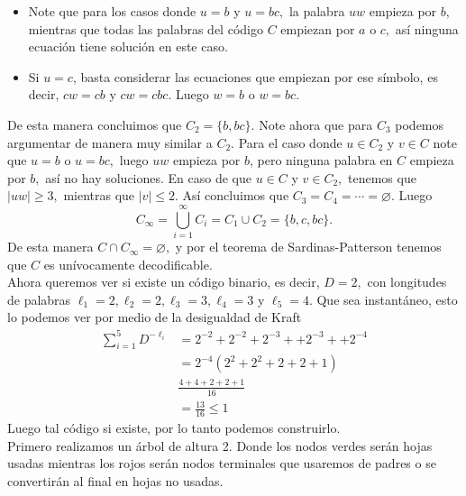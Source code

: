 \begin{sols}
    \begin{itemize}
        \item Note que para los casos donde $u=b$ y $u=bc,$ la palabra $uw$ empieza por $b,$ mientras que todas las palabras del código $C$ empiezan por $a$ o $c,$ así ninguna ecuación tiene solución en este caso.
        \item Si $u=c$, basta considerar las ecuaciones que empiezan por ese símbolo, es decir, $cw=cb$ y $cw=cbc.$ Luego $w=b$ o $w=bc.$
    \end{itemize}
    De esta manera concluimos que $C_2=\{b,bc\}.$ Note ahora que para $C_3$ podemos argumentar de manera muy similar a $C_2.$ Para el caso donde $u\in C_2$ y $v\in C$ note que $u=b$ o $u=bc,$ luego $uw$ empieza por $b$, pero ninguna palabra en $C$ empieza por $b,$ así no hay soluciones. En caso de que $u\in C$ y $v\in C_2,$ tenemos que $|uw|\geq 3,$ mientras que $|v|\leq 2.$ Así concluimos que $C_3=C_4=\cdots=\varnothing.$ Luego
    $$C_\infty=\bigcup_{i=1}^\infty C_i=C_1\cup C_2=\{b,c,bc\}.$$
    De esta manera $C\cap C_\infty=\varnothing,$ y por el teorema de Sardinas-Patterson tenemos que $C$ es unívocamente decodificable.\\

    Ahora queremos ver si existe un código binario, es decir, $D=2,$ con longitudes de palabras $\ell_1=2,\ell_2=2,\ell_3=3,\ell_4=3$ y $\ell_5=4.$ Que sea instantáneo, esto lo podemos ver por medio de la desigualdad de Kraft
    \begin{align*}
        \sum_{i=1}^5D^{-\ell_i}&=2^{-2}+2^{-2}+2^{-3}++2^{-3}++2^{-4}\\
        &=2^{-4}(2^2+2^2+2+2+1)\\
        &\frac{4+4+2+2+1}{16}\\
        &=\frac{13}{16}\leq 1
    \end{align*}
    Luego tal código si existe, por lo tanto podemos construirlo.\\

    Primero realizamos un árbol de altura 2. Donde los nodos verdes serán hojas usadas mientras los rojos serán nodos terminales que usaremos de padres o se convertirán al final en hojas no usadas.
\begin{center}
       \begin{tikzpicture}[level 1/.style={sibling distance=25mm}, level 2/.style={sibling distance=15mm}]


\end{tikzpicture}
\end{center}
\end{sols}
